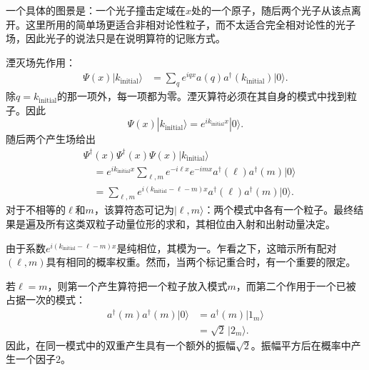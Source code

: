 一个具体的图景是：一个光子撞击定域在\(x\)处的一个原子，随后两个光子从该点离开。这里所用的简单场更适合非相对论性粒子，而不太适合完全相对论性的光子场，因此光子的说法只是在说明算符的记账方式。

湮灭场先作用：
\begin{align}
\Psi(x)|k_{\mathrm{initial}}\rangle
&=\sum_q e^{iqx}a(q)a^\dagger(k_{\mathrm{initial}})|0\rangle.
\end{align}
除\(q=k_{\mathrm{initial}}\)的那一项外，每一项都为零。湮灭算符必须在其自身的模式中找到粒子。因此
\begin{equation}
\Psi(x)|k_{\mathrm{initial}}\rangle
=e^{ik_{\mathrm{initial}}x}|0\rangle.
\end{equation}
随后两个产生场给出
\begin{align}
&\Psi^\dagger(x)\Psi^\dagger(x)\Psi(x)
|k_{\mathrm{initial}}\rangle
\\
&\quad=
e^{ik_{\mathrm{initial}}x}
\sum_{\ell,m}
e^{-i\ell x}e^{-imx}
a^\dagger(\ell)a^\dagger(m)|0\rangle
\\
&\quad=
\sum_{\ell,m}
e^{i(k_{\mathrm{initial}}-\ell-m)x}
a^\dagger(\ell)a^\dagger(m)|0\rangle.
\end{align}
对于不相等的\(\ell\)和\(m\)，该算符态可记为\(|\ell,m\rangle\)：两个模式中各有一个粒子。最终结果是遍及所有这类双粒子动量位形的求和，其相位由入射和出射动量决定。

\begin{classroomqa}
\end{classroomqa}

\begin{classroomqa}
\end{classroomqa}

由于系数\(e^{i(k_{\mathrm{initial}}-\ell-m)x}\)是纯相位，其模为一。乍看之下，这暗示所有配对\((\ell,m)\)具有相同的概率权重。然而，当两个标记重合时，有一个重要的限定。

若\(\ell=m\)，则第一个产生算符把一个粒子放入模式\(m\)，而第二个作用于一个已被占据一次的模式：
\begin{align}
a^\dagger(m)a^\dagger(m)|0\rangle
&=a^\dagger(m)|1_m\rangle\\
&=\sqrt{2}\,|2_m\rangle.
\end{align}
因此，在同一模式中的双重产生具有一个额外的振幅\(\sqrt{2}\)。振幅平方后在概率中产生一个因子\(2\)。

